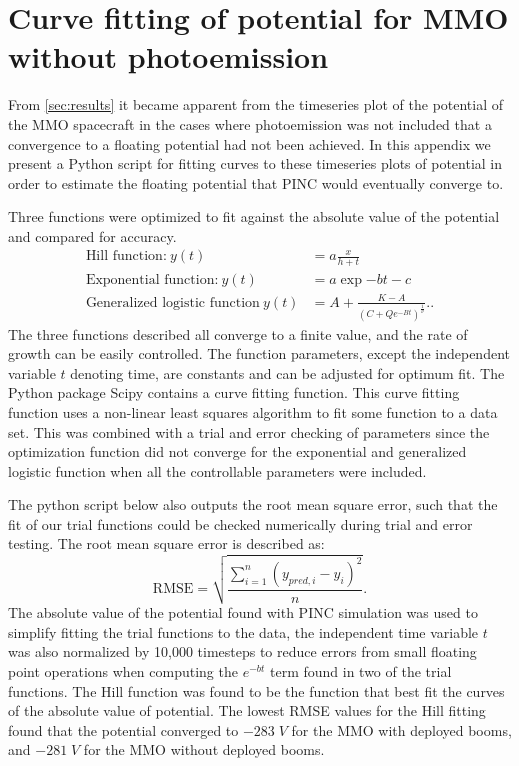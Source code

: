 \chapter{Curve fitting of potential for MMO without photoemission}
\label{sec:appendixC}
\newenvironment{longlisting}{\captionsetup{type=listing}}{}

From \cref{sec:results} it became apparent from the timeseries plot of the potential of the MMO spacecraft in the cases where photoemission was not included that a convergence to a floating potential had not been achieved. In this appendix we present a Python script for fitting curves to these timeseries plots of potential in order to estimate the floating potential that PINC would eventually converge to.

Three functions were optimized to fit against the absolute value of the potential and compared for accuracy.
\begin{subequations}
    \begin{align}
        \text{Hill function:} \: y(t) &= a \frac{x}{h + t}\label{eq:Hill} \\
        \text{Exponential function:} \: y(t) &= a \exp{-b t} - c \label{eq:expFit} \\
        \text{Generalized logistic function} \: y(t) &=  A + \frac{K - A}{\left(C + Q e^{-B t}\right)^{\frac{1}{\nu}}}.\label{eq:genLog}.
    \end{align}
\end{subequations}
The three functions described all converge to a finite value, and the rate of growth can be easily controlled. The function parameters, except the independent variable $t$ denoting time, are constants and can be adjusted for optimum fit. The Python package Scipy contains a curve fitting function. This curve fitting function uses a non-linear least squares algorithm to fit some function to a data set. This was combined with a trial and error checking of parameters since the optimization function did not converge for the exponential and generalized logistic function when all the controllable parameters were included. 

The python script below also outputs the root mean square error, such that the fit of our trial functions could be checked numerically during trial and error testing. The root mean square error is described as:
\begin{equation}\label{eq:RMSE}
    \text{RMSE} = \sqrt{\frac{\sum^n_{i=1} \left(y_{pred,i} - y_i \right)^2}{n}}.
\end{equation}
The absolute value of the potential found with PINC simulation was used to simplify fitting the trial functions to the data, the independent time variable $t$ was also normalized by 10,000 timesteps to reduce errors from small floating point operations when computing the $e^{-b t}$ term found in two of the trial functions. The Hill function was found to be the function that best fit the curves of the absolute value of potential. The lowest RMSE values for the Hill fitting found that the potential converged to $-283 \; V$ for the MMO with deployed booms, and $-281 \; V$ for the MMO without deployed booms. 

